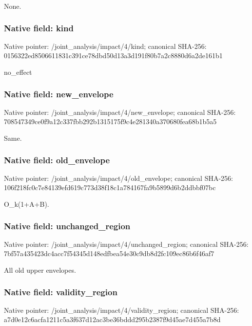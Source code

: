 \documentclass[10pt,a4paper]{article}
\begin{document}
\begingroup\raggedright\sloppy None.\par\endgroup

\subsubsection{Native field: kind}
Native pointer: /joint\_\allowbreak{}analysis/impact/4/kind; canonical SHA-256: 0156322ed8506611831c391ce78dbd50d13a3d191f80b7a2c8880d6a2de161b1

\begingroup\raggedright\sloppy no\_\allowbreak{}effect\par\endgroup

\subsubsection{Native field: new\_\allowbreak{}envelope}
Native pointer: /joint\_\allowbreak{}analysis/impact/4/new\_\allowbreak{}envelope; canonical SHA-256: 708547349ce0f9a12c337fbb292b1315175f9c4e281340a370680fea68b1b5a5

\begingroup\raggedright\sloppy Same.\par\endgroup

\subsubsection{Native field: old\_\allowbreak{}envelope}
Native pointer: /joint\_\allowbreak{}analysis/impact/4/old\_\allowbreak{}envelope; canonical SHA-256: 106f218fc0c7e84139efd619c773d38f18c1a784167fa9b5899d6b2ddbbf07bc

\begingroup\raggedright\sloppy O\_\allowbreak{}k(1+A+B).\par\endgroup

\subsubsection{Native field: unchanged\_\allowbreak{}region}
Native pointer: /joint\_\allowbreak{}analysis/impact/4/unchanged\_\allowbreak{}region; canonical SHA-256: 7bf57a435423dc4acc7f54345d148edfbea54e30c9db8d2fc109ec86b6f46af7

\begingroup\raggedright\sloppy All old upper envelopes.\par\endgroup

\subsubsection{Native field: validity\_\allowbreak{}region}
Native pointer: /joint\_\allowbreak{}analysis/impact/4/validity\_\allowbreak{}region; canonical SHA-256: a7d0e12c6acfa1211c5a3f637d12ac3be36bddd295b2387f9d45ae7d455a7b8d
\end{document}
